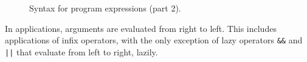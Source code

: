 \begin{figure}
  \begin{center}\framebox{}\end{center}
  \caption{Syntax for program expressions (part 2).}
\label{fig:bnf:exprb}
\end{figure}

In applications, arguments are evaluated from right to left.
This includes applications of infix operators, with the only exception of
lazy operators \verb|&&| and \verb+||+ that evaluate from left to
right, lazily.

















